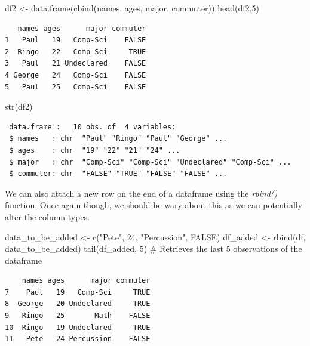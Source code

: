 \documentclass[
  letterpaper,
  DIV=11,
  numbers=noendperiod]{scrreprt}
\newenvironment{Shaded}{\begin{snugshade}}{\end{snugshade}}
\newcommand{\CommentTok}[1]{\textcolor[rgb]{0.37,0.37,0.37}{#1}}
\newcommand{\ConstantTok}[1]{\textcolor[rgb]{0.56,0.35,0.01}{#1}}
\newcommand{\DecValTok}[1]{\textcolor[rgb]{0.68,0.00,0.00}{#1}}
\newcommand{\FunctionTok}[1]{\textcolor[rgb]{0.28,0.35,0.67}{#1}}
\newcommand{\NormalTok}[1]{\textcolor[rgb]{0.00,0.23,0.31}{#1}}
\newcommand{\OtherTok}[1]{\textcolor[rgb]{0.00,0.23,0.31}{#1}}
\newcommand{\StringTok}[1]{\textcolor[rgb]{0.13,0.47,0.30}{#1}}
\begin{document}
\begin{Shaded}
\begin{Highlighting}[]
\NormalTok{df2 }\OtherTok{\textless{}{-}} \FunctionTok{data.frame}\NormalTok{(}\FunctionTok{cbind}\NormalTok{(names, ages, major, commuter))}
\FunctionTok{head}\NormalTok{(df2,}\DecValTok{5}\NormalTok{)}
\end{Highlighting}
\end{Shaded}

\begin{verbatim}
   names ages      major commuter
1   Paul   19   Comp-Sci    FALSE
2  Ringo   22   Comp-Sci     TRUE
3   Paul   21 Undeclared    FALSE
4 George   24   Comp-Sci    FALSE
5   Paul   25   Comp-Sci    FALSE
\end{verbatim}

\begin{Shaded}
\begin{Highlighting}[]
\FunctionTok{str}\NormalTok{(df2)}
\end{Highlighting}
\end{Shaded}

\begin{verbatim}
'data.frame':   10 obs. of  4 variables:
 $ names   : chr  "Paul" "Ringo" "Paul" "George" ...
 $ ages    : chr  "19" "22" "21" "24" ...
 $ major   : chr  "Comp-Sci" "Comp-Sci" "Undeclared" "Comp-Sci" ...
 $ commuter: chr  "FALSE" "TRUE" "FALSE" "FALSE" ...
\end{verbatim}

We can also attach a new row on the end of a dataframe using the
\emph{rbind()} function. Once again though, we should be wary about this
as we can potentially alter the column types.

\begin{Shaded}
\begin{Highlighting}[]
\NormalTok{data\_to\_be\_added }\OtherTok{\textless{}{-}} \FunctionTok{c}\NormalTok{(}\StringTok{"Pete"}\NormalTok{, }\DecValTok{24}\NormalTok{, }\StringTok{"Percussion"}\NormalTok{, }\ConstantTok{FALSE}\NormalTok{)}
\NormalTok{df\_added }\OtherTok{\textless{}{-}} \FunctionTok{rbind}\NormalTok{(df, data\_to\_be\_added)}
\FunctionTok{tail}\NormalTok{(df\_added, }\DecValTok{5}\NormalTok{) }\CommentTok{\# Retrieves the last 5 observations of the dataframe}
\end{Highlighting}
\end{Shaded}

\begin{verbatim}
    names ages      major commuter
7    Paul   19   Comp-Sci     TRUE
8  George   20 Undeclared     TRUE
9   Ringo   25       Math    FALSE
10  Ringo   19 Undeclared     TRUE
11   Pete   24 Percussion    FALSE
\end{verbatim}
\end{document}
